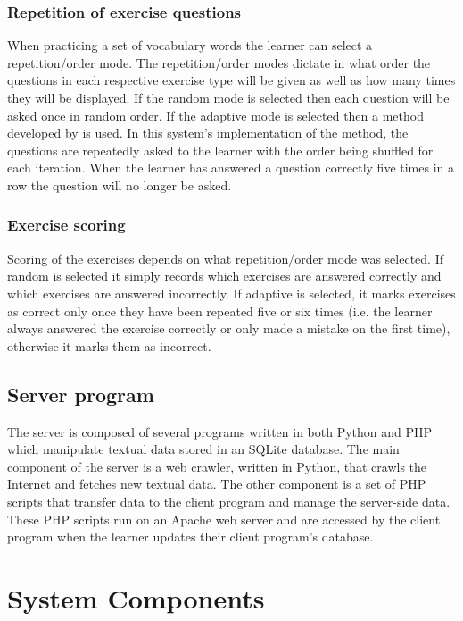 \documentclass[english]{jnlp_1.4}
\begin{document}
\subsubsection{Repetition of exercise questions}

When practicing a set of vocabulary words the learner can select a repetition/order mode. The repetition/order modes dictate in what order the questions in each respective exercise type will be given as well as how many times they will be displayed. If the random mode is selected then each question will be asked once in random order. If the adaptive mode is selected then a method developed by \cite{Article_Mondria} is used. In this system's implementation of the method, the questions are repeatedly asked to the learner with the order being shuffled for each iteration. When the learner has answered a question correctly five times in a row the question will no longer be asked.

\subsubsection{Exercise scoring}

Scoring of the exercises depends on what repetition/order mode was selected. If random is selected it simply records which exercises are answered correctly and which exercises are answered incorrectly. If adaptive is selected, it marks exercises as correct only once they have been repeated five or six times (i.e. the learner always answered the exercise correctly or only made a mistake on the first time), otherwise it marks them as incorrect.


\subsection{Server program}

The server is composed of several programs written in both Python and PHP which manipulate textual data stored in an SQLite database. The main component of the server is a web crawler, written in Python, that crawls the Internet and fetches new textual data. The other component is a set of PHP scripts that transfer data to the client program and manage the server-side data. These PHP scripts run on an Apache web server and are accessed by the client program when the learner updates their client program's database.



\section{System Components}
\end{document}
